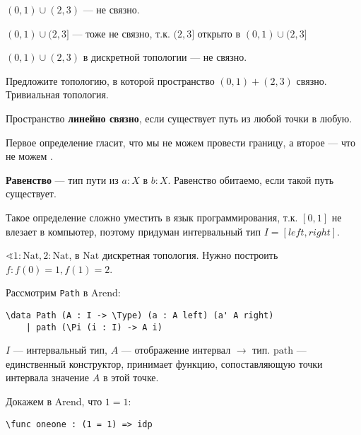 \begin{example}
    \((0, 1) \cup (2, 3)\) --- не связно.
\end{example}

\begin{example}
    \((0, 1) \cup (2, 3]\) --- тоже не связно, т.к. \((2, 3]\) открыто в \((0, 1) \cup (2, 3]\)
\end{example}

\begin{example}
    \((0, 1) \cup (2, 3)\) в дискретной топологии --- не связно.
\end{example}

\begin{exercise}
    Предложите топологию, в которой пространство \((0, 1) + (2, 3)\) связно. Тривиальная топология.
\end{exercise}

\begin{definition}
    Пространство \textbf{линейно связно}, если существует путь из любой точки в любую.
\end{definition}

Первое определение гласит, что мы не можем провести границу, а второе --- что не можем \?. %

\begin{definition}
    \textbf{Равенство} --- тип пути из \(a : X\) в \(b : X\). Равенство обитаемо, если такой путь существует.
\end{definition}

Такое определение сложно уместить в язык программирования, т.к. \([0, 1]\) не влезает в компьютер, поэтому придуман интервальный тип \(I = [left, right]\).

\begin{example}
    \(\sphericalangle 1 : \mathrm{Nat}, 2 : \mathrm{Nat}\), в \(\mathrm{Nat}\) дискретная топология. Нужно построить \(f : f( 0) = 1, f(1) = 2\).
\end{example}

Рассмотрим \texttt{Path} в Arend:
\begin{verbatim}
\data Path (A : I -> \Type) (a : A left) (a' A right)
    | path (\Pi (i : I) -> A i)
\end{verbatim}

\(I\) --- интервальный тип, \(A\) --- отображение интервал \( \to \) тип. \(\mathrm{path}\) --- единственный конструктор, принимает функцию, сопоставляющую точки интервала значение \(A\) в этой точке.

Докажем в Arend, что \(1 = 1\):
\begin{verbatim}
\func oneone : (1 = 1) => idp
\end{verbatim}

